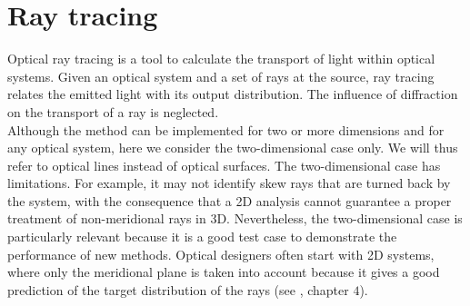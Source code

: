 \chapter{Ray tracing}\label{chap:raytracing}
Optical ray tracing is a tool to calculate the transport of light within optical systems.
Given an optical system and a set of rays at the source, ray tracing relates the emitted light with its output distribution. 
The influence of diffraction on the transport of a ray is neglected. \\ \indent
Although the method can be implemented for two or more dimensions and for any optical system, here we consider the two-dimensional case only. 
We will thus refer to optical lines instead of optical surfaces.
The two-dimensional case has limitations. For example, it may not identify skew rays that are turned back by the system, with the consequence that a 2D analysis cannot guarantee a proper treatment of non-meridional rays in 3D. 
Nevertheless, the two-dimensional case is particularly relevant because it is a good test case to demonstrate the performance of new methods.
Optical designers often start with 2D systems, where only the meridional plane is taken into account because it gives a good prediction of the target distribution of the rays
(see \cite{winston2005nonimaging}, chapter $4$).
